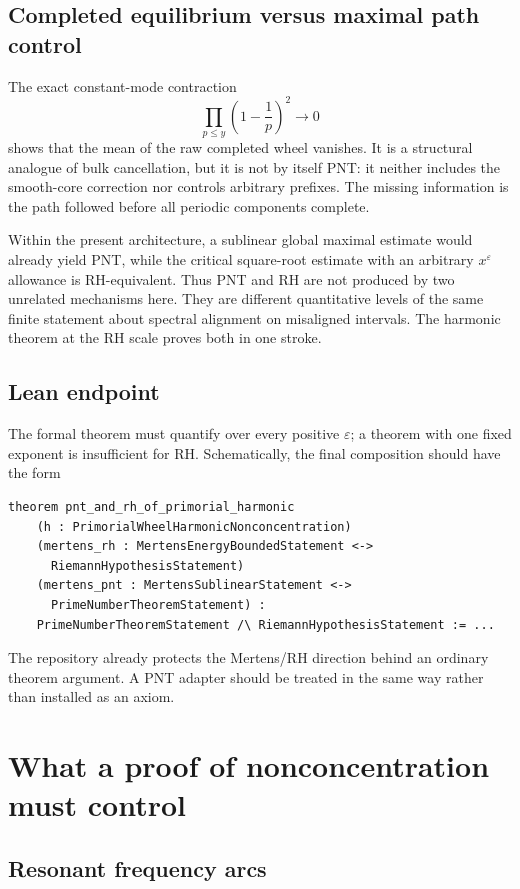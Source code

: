 \documentclass[11pt]{article}
\theoremstyle{definition}
\begin{document}
\subsection{Completed equilibrium versus maximal path control}

The exact constant-mode contraction
\[
\prod_{p\le y}\left(1-\frac1p\right)^2\longrightarrow0
\]
shows that the mean of the raw completed wheel vanishes.  It is a structural analogue of bulk cancellation, but it is not by itself PNT: it neither includes the smooth-core correction nor controls arbitrary prefixes.  The missing information is the path followed before all periodic components complete.

Within the present architecture, a sublinear global maximal estimate would already yield PNT, while the critical square-root estimate with an arbitrary $x^{\varepsilon}$ allowance is RH-equivalent.  Thus PNT and RH are not produced by two unrelated mechanisms here.  They are different quantitative levels of the same finite statement about spectral alignment on misaligned intervals.  The harmonic theorem at the RH scale proves both in one stroke.

\subsection{Lean endpoint}

The formal theorem must quantify over every positive $\varepsilon$; a theorem with one fixed exponent is insufficient for RH.  Schematically, the final composition should have the form
\begin{verbatim}
theorem pnt_and_rh_of_primorial_harmonic
    (h : PrimorialWheelHarmonicNonconcentration)
    (mertens_rh : MertensEnergyBoundedStatement <->
      RiemannHypothesisStatement)
    (mertens_pnt : MertensSublinearStatement <->
      PrimeNumberTheoremStatement) :
    PrimeNumberTheoremStatement /\ RiemannHypothesisStatement := ...
\end{verbatim}
The repository already protects the Mertens/RH direction behind an ordinary theorem argument.  A PNT adapter should be treated in the same way rather than installed as an axiom.

\section{What a proof of nonconcentration must control}

\subsection{Resonant frequency arcs}
\end{document}
